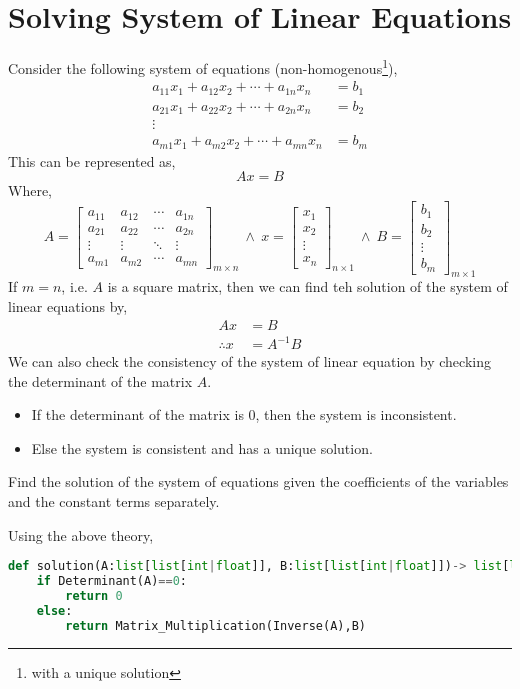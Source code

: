 \section{Solving System of Linear Equations}
Consider the following system of equations (non-homogenous\footnote{with a unique solution}),
\[\begin{split}
	a_{11}x_{1}+a_{12}x_2+\cdots +a_{1n}x_n&=b_1\\
	a_{21}x_{1}+a_{22}x_2+\cdots +a_{2n}x_n&=b_2\\
	\vdots  & \\
	a_{m1}x_{1}+a_{m2}x_2+\cdots +a_{mn}x_n&=b_m
\end{split}\]
This can be represented as,
\[Ax=B\]
Where,
\[A=\begin{bmatrix}
	a_{11} & a_{12} & \cdots & a_{1n}\\
	a_{21} & a_{22} & \cdots & a_{2n}\\
	\vdots & \vdots & \ddots & \vdots \\
	a_{m1} & a_{m2} & \cdots & a_{mn}
\end{bmatrix}_{m\times n} \ \land \ x=\begin{bmatrix}
	x_1\\
	x_2\\
	\vdots\\
	x_n
\end{bmatrix}_{n\times 1} \ \land \ B=\begin{bmatrix}
	b_{1}\\
	b_2\\
	\vdots\\
	b_m
\end{bmatrix}_{m\times 1}\]
If $m=n$, i.e. $A$ is a square matrix, then we can find teh solution of the system of linear equations by,
\[\begin{split}
	Ax&=B\\
	\therefore x&=A^{-1}B
\end{split}\] 
We can also check the consistency of the system of linear equation by checking the determinant of the matrix $A$.
\begin{itemize}
	\item If the determinant of the matrix is 0, then the system is inconsistent.
	\item Else the system is consistent and has a unique solution.
\end{itemize}
\begin{eg}
	Find the solution of the system of equations given the coefficients of the variables and the constant terms separately.
\end{eg}
\begin{explanation}
	Using the above theory,
	\begin{lstlisting}[language=Python]
def solution(A:list[list[int|float]], B:list[list[int|float]])-> list[list[int|float]]|int:
    if Determinant(A)==0:
        return 0
    else:
        return Matrix_Multiplication(Inverse(A),B)\end{lstlisting}
\end{explanation}
\newpage
